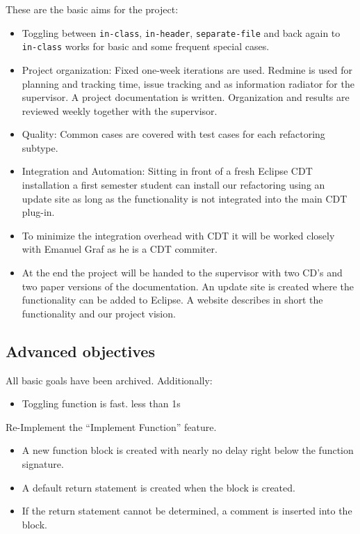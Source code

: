 These are the basic aims for the project:
\begin{itemize}
 \item Toggling between \texttt{in-class}, \texttt{in-header},
\texttt{separate-file} and back again to \texttt{in-class} works for basic and
some frequent special cases.
 \item Project organization: Fixed one-week iterations are used. Redmine is used
for planning and tracking time, issue tracking and as information radiator for
the supervisor. A project documentation is written. Organization and results are
reviewed weekly together with the supervisor.
 \item Quality: Common cases are covered with test cases for each
refactoring subtype.
 \item Integration and Automation: Sitting in front of a fresh Eclipse CDT
installation a first semester student can install our refactoring using an
update site as long as the functionality is not integrated into the main CDT
plug-in.
 \item To minimize the integration overhead with CDT it will be worked closely
with Emanuel Graf as he is a CDT commiter.
 \item At the end the project will be handed to the supervisor with two CD's and
two paper versions of the documentation. An update site is created where the
functionality can be added to Eclipse. A website describes in short the
functionality and our project vision.
\end{itemize}

\subsection{Advanced objectives}
All basic goals have been archived. Additionally:\newline
\begin{itemize}
 \item Toggling function is fast. less than 1s
\end{itemize}

Re-Implement the ``Implement Function'' feature.
\begin{itemize}
 \item A new function block is created with nearly no delay right below the
function signature.
 \item A default return statement is created when the block is created.
 \item If the return statement cannot be determined, a comment is inserted into
the block.
\end{itemize}

